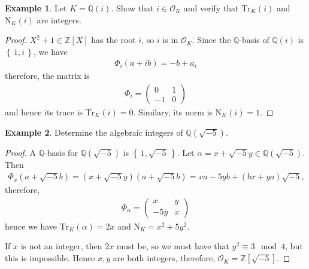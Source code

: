 \documentclass[a4paper]{book}
\theoremstyle{definition}
\newtheorem{example}{Example}[definition]
\newcommand{\set}[1]{\left\{\, #1 \,\right\}}
\begin{document}
\begin{example}
    Let \(K = \mathbb{Q}(i)\). Show that \(i \in \mathcal{O}_K\) and verify that \(\mathrm{Tr}_K(i)\) and \(\mathrm{N}_K(i)\) are integers.
\end{example}
\begin{proof}
    \(X^2 + 1 \in \mathbb{Z}[X]\) has the root \(i\), so \(i\) is in \(\mathcal{O}_K\). Since the \(\mathbb{Q}\)-basis of \(\mathbb{Q}(i)\) is \(\set{1, i}\), we have
    \begin{align*}
        \Phi_i(a + ib) = -b + a_i
    \end{align*}
    therefore, the matrix is
    \begin{align*}
        \Phi_i =
        \begin{pmatrix}
            0 & 1 \\ -1 & 0
        \end{pmatrix}
    \end{align*}
    and hence its trace is \(\mathrm{Tr}_K(i) = 0\). Similary, its norm is \(\mathrm{N}_K(i) = 1\).
\end{proof}
\begin{example}
    Determine the algebraic integers of \(\mathbb{Q}(\sqrt{-5})\).
\end{example}

\begin{proof}
    A \(\mathbb{Q}\)-basis for \(\mathbb{Q}(\sqrt{-5})\) is \(\set{1, \sqrt{-5}}\). Let \(\alpha = x + \sqrt{-5}y \in \mathbb{Q}(\sqrt{-5})\). Then
    \begin{align*}
        \Phi_x (a + \sqrt{-5} b) = (x + \sqrt{-5}y)(a + \sqrt{-5}b) = xa -5 yb + (bx + ya) \sqrt{-5} \text{,} 
    \end{align*}
    therefore,
    \begin{align*}
        \Phi_\alpha =
        \begin{pmatrix}
            x & y \\ -5 y & x
        \end{pmatrix}
    \end{align*}
    hence we have \(\mathrm{Tr}_K(\alpha) = 2x\) and \(\mathrm{N}_K = x^2 + 5y^2\).

    If \(x\) is not an integer, then \(2x\) must be, so we must have that \(y^2 \equiv 3 \mod 4\), but this is impossible. Hence \(x, y\) are both integers, therefore, \(\mathcal{O}_K = \mathbb{Z}[\sqrt{-5}]\).
\end{proof}
\end{document}

